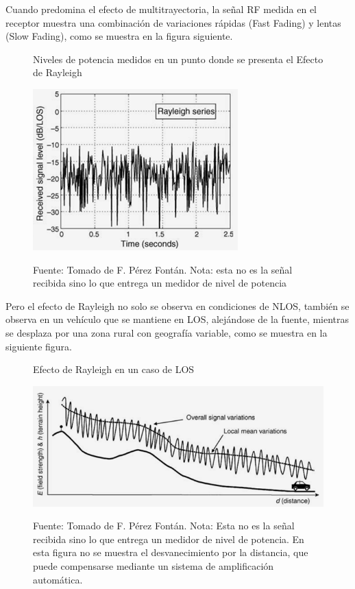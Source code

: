 Cuando predomina el efecto de multitrayectoria, la señal RF medida en el receptor muestra una combinación de variaciones rápidas (Fast Fading) y lentas (Slow Fading), como se muestra en la figura siguiente. \\ 

\begin{figure}[h!]
	\captionsetup{justification = raggedright, singlelinecheck = false}
	\caption{Niveles de potencia medidos en un punto donde se presenta el Efecto de Rayleigh} 
	\centering
	\includegraphics[scale=1]{Imagenes/Rayleigh.png}
	\label{fig:Rayleigh}
		\caption*{Fuente: Tomado de F. Pérez Fontán. Nota: esta no es la señal recibida sino lo que entrega un medidor de nivel de potencia} 
\end{figure}

Pero el efecto de Rayleigh no solo se observa en condiciones de NLOS, también se observa en un vehículo que se mantiene en LOS, alejándose de la fuente, mientras se desplaza por una zona rural con geografía variable, como se muestra en la siguiente figura. \\

\vspace{200px}
\begin{figure}[h!]
	\captionsetup{justification = raggedright, singlelinecheck = false}
	\caption{Efecto de Rayleigh en un caso de LOS} 
	\centering
	\includegraphics[scale=1]{Imagenes/Field.png}
	\label{fig:Field}
	\caption*{Fuente: Tomado de F. Pérez Fontán. Nota: Esta no es la señal recibida sino lo que entrega un medidor de nivel de potencia. En esta figura no se muestra el desvanecimiento por la distancia, que puede compensarse mediante un sistema de amplificación automática.} 
\end{figure}

